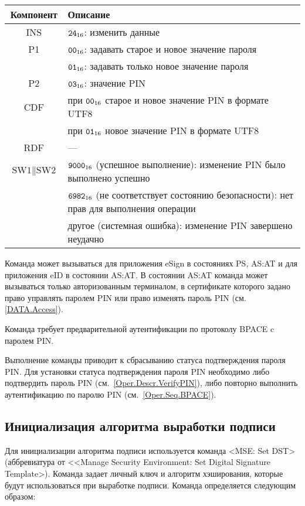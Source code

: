 \noindent
\begin{tabular}{|c|p{14cm}|}
\hline
Компонент & 	Описание \\
\hline
\hline
INS & $\texttt{24}_{16}$: изменить данные\\
\hline
P1 & $\texttt{00}_{16}$: задавать старое и новое значение пароля \\
   & $\texttt{01}_{16}$: задавать только новое значение пароля\\
\hline
P2 & $\texttt{03}_{16}$: значение PIN \\
\hline
CDF & при $\texttt{00}_{16}$ старое и новое значение PIN в формате UTF8\\
    & при $\texttt{01}_{16}$ новое значение PIN в формате UTF8\\
\hline \hline
RDF & 	 --- \\
\hline
$\text{SW1}\parallel\text{SW2}$ & $\texttt{9000}_{16}$ (успешное выполнение): 
изменение PIN было выполнено успешно\\
 & $\texttt{6982}_{16}$ (не соответствует состоянию безопасности): нет прав для 
выполнения операции\\
 & другое (системная ошибка): изменение PIN завершено неудачно\\
\hline
\end{tabular}

Команда может вызываться для приложения eSign в состояниях 
PS, AS:AT и для приложения eID в состоянии AS:AT. 
В состоянии AS:AT команда может вызываться 
только авторизованным терминалом,
в сертификате которого задано право 
управлять паролем PIN или право изменять пароль 
PIN (см. \ref{DATA.Access}).

Команда требует предварительной аутентификации по 
протоколу BPACE c паролем PIN. 

Выполнение команды приводит к сбрасыванию 
статуса подтверждения пароля PIN.
Для установки статуса подтверждения пароля PIN 
необходимо либо подтвердить пароль PIN (см.~\ref{Oper.Descr.VerifyPIN}), 
либо повторно выполнить аутентификацию по паролю PIN (см.~\ref{Oper.Seq.BPACE}).


\subsection{Инициализация алгоритма выработки подписи}
\label{Oper.Descr.SetDST}
Для инициализации алгоритма подписи используется команда     
<MSE: Set DST> (аббревиатура от <<Manage Security Environment: Set 
Digital Signature Template>).
Команда задает личный ключ и алгоритм
хэширования, которые будут использоваться при выработке подписи.
Команда определяется следующим образом:

